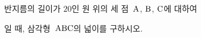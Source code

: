 반지름의 길이가 $20$인 원 위의 세 점~$\mathrm{A}$, $\mathrm{B}$, $\mathrm{C}$에 대하여 \par\smallskip{}\par\smallskip\noindent 일 때, 삼각형~$\mathrm{ABC}$의 넓이를 구하시오.
